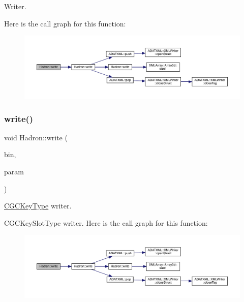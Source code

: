 Writer. 

Here is the call graph for this function\+:\nopagebreak
\begin{figure}[H]
\begin{center}
\leavevmode
\includegraphics[width=350pt]{d1/daf/namespaceHadron_ab3f6a936fc8ba9b50904aca066146f48_cgraph}
\end{center}
\end{figure}
\mbox{\label{namespaceHadron_ae48dac33aabaaf829859c63a77a06b8b}} 
\subsubsection{\texorpdfstring{write()}{write()}\hspace{0.1cm}{\footnotesize\ttfamily [17/95]}}
{\footnotesize\ttfamily void Hadron\+::write (\begin{DoxyParamCaption}\item[{\mbox{\hyperlink{classADATIO_1_1BinaryWriter}{Binary\+Writer}} \&}]{bin,  }\item[{const \mbox{\hyperlink{structHadron_1_1KeyCGCIrrepMom__t}{Key\+C\+G\+C\+Irrep\+Mom\+\_\+t}} \&}]{param }\end{DoxyParamCaption})}



\mbox{\hyperlink{structHadron_1_1CGCKeyType}{C\+G\+C\+Key\+Type}} writer. 

C\+G\+C\+Key\+Slot\+Type writer. Here is the call graph for this function\+:\nopagebreak
\begin{figure}[H]
\begin{center}
\leavevmode
\includegraphics[width=350pt]{d1/daf/namespaceHadron_ae48dac33aabaaf829859c63a77a06b8b_cgraph}
\end{center}
\end{figure}
\mbox{\label{namespaceHadron_af4fede7daa1a73ae6be48e039292c692}} 
